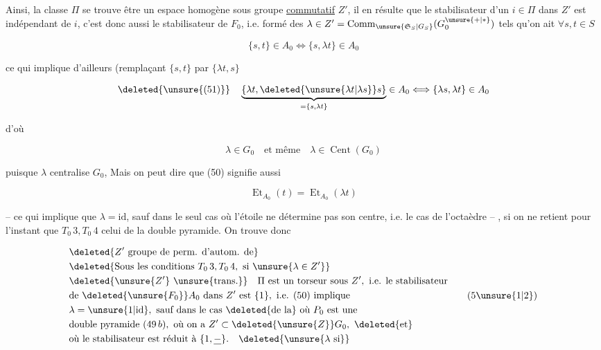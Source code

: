 
Ainsi, la classe $\Pi$  se trouve être un espace homogène sous  groupe \uline{commutatif} $Z'$, il en résulte que le stabilisateur d'un $i\in\Pi$ dans $Z'$ est indépendant de $i$, c'est donc aussi le stabilisateur de $F_0$,  i.e. formé des $\lambda\in Z'=\operatorname{Comm}_{\unsure{\mathfrak S_S|G_S}}(G_0^{\unsure{+|\ast}})$ tels qu'on ait $\forall s,t\in S$

\[
\{s,t\}\in A_0\Longleftrightarrow\{s,\lambda t\}\in A_0
\tag*{$(50)$}
\]

ce qui implique d'ailleurs (remplaçant $\{s,t\}$ par $\{\lambda t,s\}$

\[
\deleted{\unsure{(51)}}\quad
\underbrace{\{\lambda t,\deleted{\unsure{\lambda t|\lambda s}}s\}}_{=\{s,\lambda t\}}\in A_0
\Longleftrightarrow\{\lambda s,\lambda t\}\in A_0
\]

d'où

\[
\lambda\in G_0\quad\text{et même}\quad \lambda\in\operatorname{Cent}(G_0)
\]

puisque $\lambda$ centralise $G_0$,  Mais  on peut dire que (50) signifie aussi

\[
\operatorname{Et}_{A_0}(t)=\operatorname{Et}_{A_0}(\lambda t)
\tag*{$(51)$}
\]

-- ce qui implique que $\lambda=\mathrm{id}$, sauf dans le seul cas où  l'étoile ne détermine pas son centre, i.e. le cas  de l'octaèdre -- , si on ne retient pour l'instant que $T_0\,3,T_0\,4$ celui de la double pyramide. On trouve donc

\[
\begin{aligned}
&\deleted{Z'\ \text{groupe de perm. d'autom. de}}\\
&\deleted{\text{Sous les conditions }T_0\,3,T_0\,4,\ \text{si }\unsure{\lambda\in Z'}}\\
&\deleted{\unsure{Z'}\ \text{\unsure{trans.}}}\quad \Pi\text{ est un torseur sous }Z',\ \text{i.e. le stabilisateur}\\
&\text{de }\deleted{\unsure{F_0}}A_0\text{ dans }Z'\text{ est }\{1\},\ \text{i.e. (50) implique}\\
&\lambda=\unsure{1|\mathrm{id}},\ \text{sauf dans le cas }\deleted{\text{de la}}\text{ où }P_0\text{ est une}\\
&\text{double pyramide }(49\,b),\ \text{où on a }Z'\subset\deleted{\unsure{Z}}G_0,\ \deleted{\text{et}}\\
&\text{où le stabilisateur est réduit à }\{1,\underline-\}.\quad\deleted{\unsure{\lambda\text{ si}}}
\end{aligned}\tag*{$(5\unsure{1|2})$}
\]

